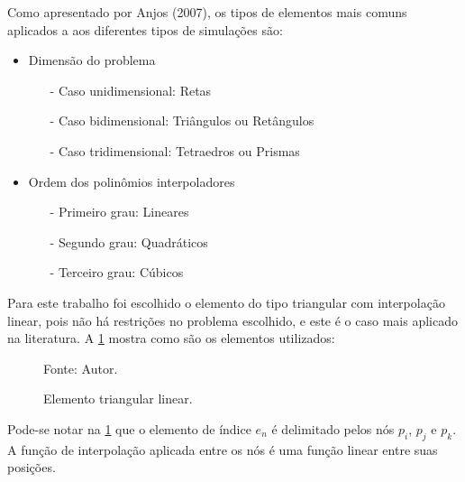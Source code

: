Como apresentado por Anjos (2007)\cite{gustavo}, os tipos de elementos mais comuns aplicados a aos diferentes tipos de simulações são:
\begin{itemize}
    \item Dimensão do problema
    \begin{itemize}
        \item[-] Caso unidimensional: Retas
        \item[-] Caso bidimensional: Triângulos ou Retângulos
        \item[-] Caso tridimensional: Tetraedros ou Prismas
    \end{itemize}
    \item Ordem dos polinômios interpoladores
    \begin{itemize}
        \item[-] Primeiro grau: Lineares 
        \item[-] Segundo grau: Quadráticos
        \item[-] Terceiro grau: Cúbicos
    \end{itemize}
\end{itemize}

Para este trabalho foi escolhido o elemento do tipo triangular com interpolação linear, pois não há restrições no problema escolhido, e este é o caso mais aplicado na literatura.
A \ref{element} mostra como são os elementos utilizados:
\begin{figure}[H]
    \centering
     {\raggedleft \scriptsize Fonte: Autor.}
    \caption{Elemento triangular linear.}
    \label{element}
\end{figure}

Pode-se notar na \ref{element} que o elemento de índice $e_n$ é delimitado pelos nós $p_i$, $p_j$ e $p_k$.
A função de interpolação aplicada entre os nós é uma função linear entre suas posições.

